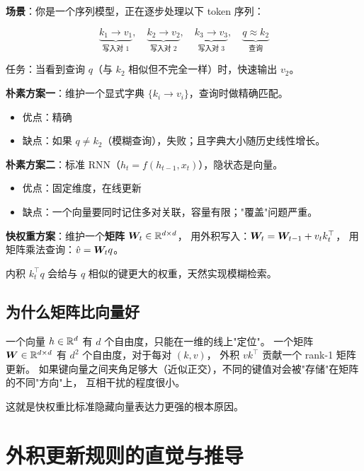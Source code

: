 \begin{toybox}[title=玩具问题 B：键值联想记忆（Associative Recall）]
\textbf{场景}：你是一个序列模型，正在逐步处理以下 token 序列：

\[
  \underbrace{k_1 \to v_1}_{\text{写入对 1}},\quad
  \underbrace{k_2 \to v_2}_{\text{写入对 2}},\quad
  \underbrace{k_3 \to v_3}_{\text{写入对 3}},\quad
  \underbrace{q \approx k_2}_{\text{查询}}
\]

任务：当看到查询 $q$（与 $k_2$ 相似但不完全一样）时，快速输出 $v_2$。

\textbf{朴素方案一}：维护一个显式字典 $\{k_i \to v_i\}$，查询时做精确匹配。
\begin{itemize}
  \item 优点：精确
  \item 缺点：如果 $q \ne k_2$（模糊查询），失败；且字典大小随历史线性增长。
\end{itemize}

\textbf{朴素方案二}：标准 RNN（$h_t = f(h_{t-1}, x_t)$），隐状态是向量。
\begin{itemize}
  \item 优点：固定维度，在线更新
  \item 缺点：一个向量要同时记住多对关联，容量有限；"覆盖"问题严重。
\end{itemize}

\textbf{快权重方案}：维护一个\textbf{矩阵} $\boldsymbol{W}_t \in \mathbb{R}^{d \times d}$，
用外积写入：$\boldsymbol{W}_t = \boldsymbol{W}_{t-1} + v_t k_t^\top$，
用矩阵乘法查询：$\hat{v} = \boldsymbol{W}_t q$。

内积 $k_t^\top q$ 会给与 $q$ 相似的键更大的权重，天然实现模糊检索。
\end{toybox}

\subsection*{为什么矩阵比向量好}

一个向量 $h \in \mathbb{R}^d$ 有 $d$ 个自由度，只能在一维的线上"定位"。
一个矩阵 $\boldsymbol{W} \in \mathbb{R}^{d \times d}$ 有 $d^2$ 个自由度，对于每对 $(k, v)$，
外积 $v k^\top$ 贡献一个 rank-1 矩阵更新。
如果键向量之间夹角足够大（近似正交），不同的键值对会被"存储"在矩阵的不同"方向"上，
互相干扰的程度很小。

这就是快权重比标准隐藏向量表达力更强的根本原因。

\section{外积更新规则的直觉与推导}
\label{sec:fastweights_derivation}


